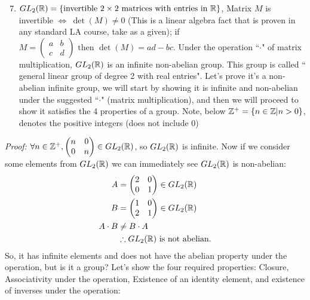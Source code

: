 \begin{enumerate}
\setcounter{enumi}{6}
    \item $GL_2({\mathbb{ R}})=\{\text{invertible } 2\times 2 \text{ matrices with entries in } {\mathbb{ R}}\}$, Matrix $M$ is invertible $\iff  \ \det(M)\neq 0$ (This is a linear algebra fact that is proven in any standard LA course, take as a given); if $M= 	\left(\begin{matrix}
a & b \\
c & d 
\end{matrix}\right) \text{ then } \det(M)=ad-bc$. Under the operation ``$\cdot$" of matrix multiplication, $GL_2({\mathbb{ R}})$ is an infinite non-abelian group. This group is called `` general linear group of degree 2 with real entries". Let's prove it's a non-abelian infinite group, we will start by showing it is infinite and non-abelian under the suggested ``$\cdot$" (matrix multiplication), and then we will proceed to show it satisfies the 4 properties of a group. Note, below ${\mathbb{ Z}}^+ = \{n\in {\mathbb{ Z}}| n>0\}$, denotes the positive integers (does not include 0)\steezybreak\\
\end{enumerate}
\noindent \textit{Proof:} $\forall n \in {\mathbb{ Z}}^+, \left(\begin{matrix}
n & 0 \\
0 & n 
\end{matrix}\right) \in GL_2({\mathbb{ R}})$, so $GL_2({\mathbb{ R}})$ is infinite. Now if we consider some elements from $GL_2({\mathbb{ R}})$ we can immediately see $GL_2({\mathbb{ R}})$ is non-abelian:\\
\begin{align}
    A &= \left(\begin{matrix}
2 & 0 \\
0 & 1 
\end{matrix}\right) \in GL_2({\mathbb{ R}}) \nonumber \\
B &= \left(\begin{matrix}
1 & 0 \\
2 & 1 
\end{matrix}\right) \in GL_2({\mathbb{ R}}) \nonumber \\
A\cdot B &\neq B\cdot A \nonumber \\
&\therefore GL_2({\mathbb{ R}}) \text{ is not abelian.} \nonumber
\end{align}
So, it has infinite elements and does not have the abelian property under the operation, but is it a group? Let's show the four required properties: Closure, Associativity under the operation, Existence of an identity element, and existence of inverses under the operation:
